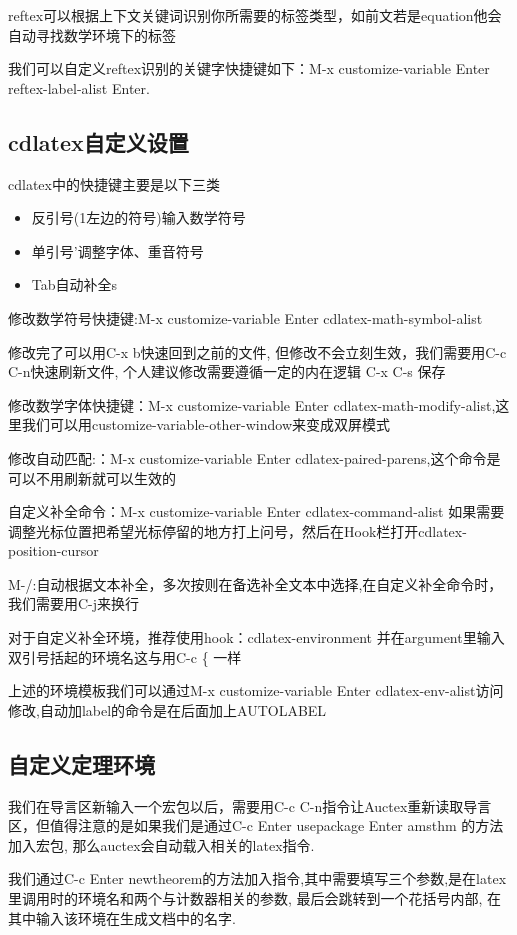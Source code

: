 \documentclass[UTF8]{ctexart}
\begin{document}
reftex可以根据上下文关键词识别你所需要的标签类型，如前文若是equation他会自动寻找数学环境下的标签

我们可以自定义reftex识别的关键字快捷键如下：M-x customize-variable Enter reftex-label-alist Enter.
\subsection{cdlatex自定义设置}
cdlatex中的快捷键主要是以下三类
\begin{itemize}
\item 反引号(1左边的符号)输入数学符号
\item 单引号'调整字体、重音符号
\item Tab自动补全s
\end{itemize}
修改数学符号快捷键:M-x customize-variable Enter cdlatex-math-symbol-alist

修改完了可以用C-x b快速回到之前的文件, 但修改不会立刻生效，我们需要用C-c C-n快速刷新文件, 个人建议修改需要遵循一定的内在逻辑 C-x C-s 保存

修改数学字体快捷键：M-x customize-variable Enter cdlatex-math-modify-alist,这里我们可以用customize-variable-other-window来变成双屏模式

修改自动匹配:：M-x customize-variable Enter cdlatex-paired-parens,这个命令是可以不用刷新就可以生效的

自定义补全命令：M-x customize-variable Enter cdlatex-command-alist 如果需要调整光标位置把希望光标停留的地方打上问号，然后在Hook栏打开cdlatex-position-cursor

M-/:自动根据文本补全，多次按则在备选补全文本中选择,在自定义补全命令时，我们需要用C-j来换行

对于自定义补全环境，推荐使用hook：cdlatex-environment 并在argument里输入双引号括起的环境名这与用C-c \{ 一样

上述的环境模板我们可以通过M-x customize-variable Enter cdlatex-env-alist访问修改,自动加label的命令是在后面加上AUTOLABEL

\subsection{自定义定理环境}
我们在导言区新输入一个宏包以后，需要用C-c C-n指令让Auctex重新读取导言区，但值得注意的是如果我们是通过C-c Enter usepackage Enter amsthm 的方法加入宏包, 那么auctex会自动载入相关的latex指令.

我们通过C-c Enter newtheorem的方法加入指令,其中需要填写三个参数,是在latex里调用时的环境名和两个与计数器相关的参数, 最后会跳转到一个花括号内部, 在其中输入该环境在生成文档中的名字.
\end{document}
